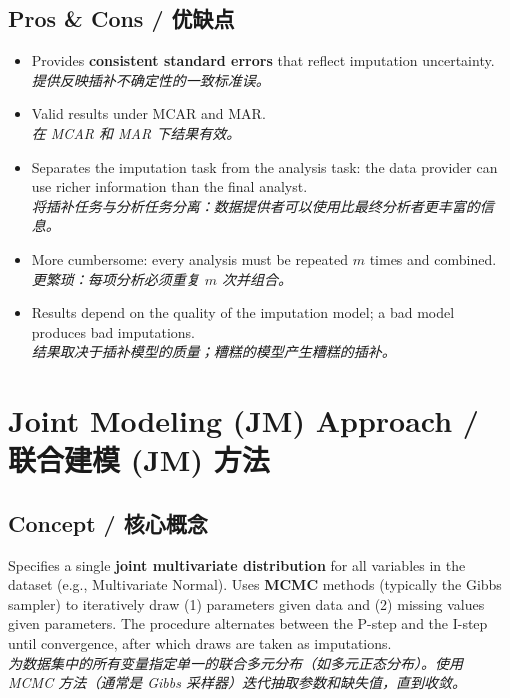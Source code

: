 \documentclass[9pt, a4paper]{article}
\begin{document}
\subsection{Pros \& Cons / 优缺点}
\begin{tcolorbox}[prosbox]
    \begin{itemize}
        \item [\ding{51}] Provides \textbf{consistent standard errors} that reflect imputation uncertainty.\\
        \textit{提供反映插补不确定性的一致标准误。}
        \item [\ding{51}] Valid results under MCAR and MAR.\\
        \textit{在 MCAR 和 MAR 下结果有效。}
        \item [\ding{51}] Separates the imputation task from the analysis task: the data provider can use richer information than the final analyst.\\
        \textit{将插补任务与分析任务分离：数据提供者可以使用比最终分析者更丰富的信息。}
    \end{itemize}
\end{tcolorbox}
\begin{tcolorbox}[consbox]
    \begin{itemize}
        \item [\ding{55}] More cumbersome: every analysis must be repeated $m$ times and combined.\\
        \textit{更繁琐：每项分析必须重复 $m$ 次并组合。}
        \item [\ding{55}] Results depend on the quality of the imputation model; a bad model produces bad imputations.\\
        \textit{结果取决于插补模型的质量；糟糕的模型产生糟糕的插补。}
    \end{itemize}
\end{tcolorbox}

\section{Joint Modeling (JM) Approach / 联合建模 (JM) 方法}

\subsection{Concept / 核心概念}
\begin{tcolorbox}[defbox]
    Specifies a single \textbf{joint multivariate distribution} for all variables in the dataset (e.g., Multivariate Normal). Uses \textbf{MCMC} methods (typically the Gibbs sampler) to iteratively draw (1) parameters given data and (2) missing values given parameters. The procedure alternates between the P-step and the I-step until convergence, after which draws are taken as imputations.\\
    \textit{为数据集中的所有变量指定单一的联合多元分布（如多元正态分布）。使用 MCMC 方法（通常是 Gibbs 采样器）迭代抽取参数和缺失值，直到收敛。}
\end{tcolorbox}
\end{document}
